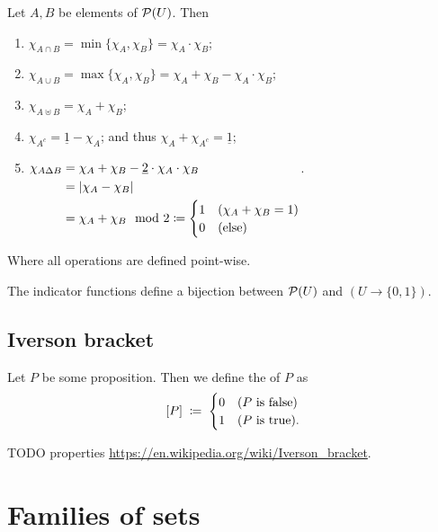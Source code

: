 \begin{lemma}
Let $A,B$ be elements of $\operatorname{\mathcal{P}}(U)$. Then
\begin{enumerate}
\item $\chi_{A\cap B} = \min\{\chi_A,\chi_B\} = \chi_A\cdot \chi_B$;
\item $\chi_{A\cup B} = \max\{\chi_A,\chi_B\} = \chi_A + \chi_B - \chi_A\cdot \chi_B$;
\item $\chi_{A\uplus B} = \chi_A + \chi_B$;
\item $\chi_{A^c} = \underline{1}-\chi_A$; and thus $\chi_A + \chi_{A^c} = \underline{1}$;
\item $\chi_{A\Delta B} \begin{aligned}[t] &= \chi_A + \chi_B - \underline{2}\cdot\chi_A\cdot \chi_B \\
&= |\chi_A - \chi_B| \\
&= \chi_A + \chi_B \mod 2 \coloneqq \begin{cases}
1 & (\chi_A + \chi_B = 1) \\
0 & \text{(else)}
\end{cases}
\end{aligned}$.
\end{enumerate}
Where all operations are defined point-wise.
\end{lemma}

\begin{proposition}
The indicator functions define a bijection between $\operatorname{\mathcal{P}}(U)$ and $(U\to \{0,1\})$.
\end{proposition}

\subsection{Iverson bracket}
\begin{definition}
Let $P$ be some proposition. Then we define the  of $P$ as
\[ \Iverson{P} \;\defeq\; \begin{cases}
0 & (\text{$P$ is false}) \\
1 & (\text{$P$ is true}).
\end{cases} \]
\end{definition}

TODO properties \url{https://en.wikipedia.org/wiki/Iverson_bracket}.

\section{Families of sets}
